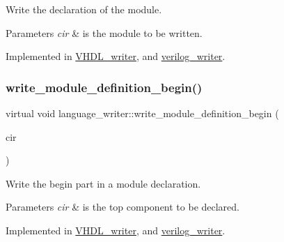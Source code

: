 Write the declaration of the module. 


\begin{DoxyParams}{Parameters}
{\em cir} & is the module to be written. \\
\hline
\end{DoxyParams}


Implemented in \hyperlink{structVHDL__writer_a9387c719414e8fb4e8b086ce9d9bc500}{V\+H\+D\+L\+\_\+writer}, and \hyperlink{classverilog__writer_a1acf62504aefe5c48d6257cf707b59c3}{verilog\+\_\+writer}.

\mbox{\label{classlanguage__writer_a53b7db2b1ad81b2ee89ff81705b0f0ff}} 
\subsubsection{\texorpdfstring{write\+\_\+module\+\_\+definition\+\_\+begin()}{write\_module\_definition\_begin()}}
{\footnotesize\ttfamily virtual void language\+\_\+writer\+::write\+\_\+module\+\_\+definition\+\_\+begin (\begin{DoxyParamCaption}\item[{const \hyperlink{structural__objects_8hpp_a8ea5f8cc50ab8f4c31e2751074ff60b2}{structural\+\_\+object\+Ref} \&}]{cir }\end{DoxyParamCaption})\hspace{0.3cm}{\ttfamily [pure virtual]}}



Write the begin part in a module declaration. 


\begin{DoxyParams}{Parameters}
{\em cir} & is the top component to be declared. \\
\hline
\end{DoxyParams}


Implemented in \hyperlink{structVHDL__writer_a36282fe093991df0bd1b5c1df8466fd6}{V\+H\+D\+L\+\_\+writer}, and \hyperlink{classverilog__writer_a8c7225cfbd24b813da3fc7a790ff1e1c}{verilog\+\_\+writer}.

\mbox{\label{classlanguage__writer_a57586ab4a2816a9eeb3658b9f072d02d}} 
